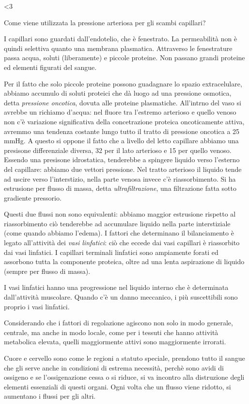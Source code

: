 \documentclass[a4paper,12pt]{article}
\begin{document}
<3

Come viene utilizzata la pressione arteriosa per gli scambi capillari?

I capillari sono guardati dall'endotelio, che è fenestrato. La permeabilità non è quindi selettiva quanto una membrana plasmatica. Attraverso le fenestrature passa acqua, soluti (liberamente) e piccole proteine. Non passano grandi proteine ed elementi figurati del sangue.

Per il fatto che solo piccole proteine possono guadagnare lo spazio extracelulare, abbiamo accumulo di soluti proteici che dà luogo ad una pressione osmotica, detta \emph{pressione oncotica}, dovuta alle proteine plasmatiche. All'intrno del vaso si avrebbe un richiamo d'acqua: nel fluore tra l'estremo arterioso e quello venoso non c'è variazione significativa della concetrazione proteica oncoticamente attiva, avremmo una tendenza costante lungo tutto il tratto di pressione oncotica a 25 mmHg. A questo si oppone il fatto che a livello del letto capillare abbiamo una presisone differenziale diversa, 32 per il lato arterioso e 15 per quello venoso. Essendo una presisone idrostatica, tenderebbe a spingere liquido verso l'esterno del capillare: abbiamo due vettori pressione. Nel tratto arterioso il liquido tende ad uscire verso l'interstizio, nella parte venosa invece c'è riassorbimento. Si ha estrusione per flusso di massa, detta \emph{ultrafiltrazione}, una filtrazione fatta sotto gradiente pressorio.

Questi due flussi non sono equivalenti: abbiamo maggior estrusione rispetto al riassorbimento ciò tenderebbe ad accumulare liquido nella parte interstiziale (come quando abbiamo l'edema). I fattori che determinano il bilanciamento è legato all'attività dei \emph{vasi linfatici}: ciò che eccede dai vasi capillari è riassorbito dai vasi linfatici. I capillari terminali linfatici sono ampiamente forati ed assorbono tutta la componente proteica, oltre ad una lenta aspirazione di liquido (sempre per flusso di massa).

I vasi linfatici hanno una progressione nel liquido interno che è determinata dall'attività muscolare. Quando c'è un danno meccanico, i più suscettibili sono proprio i vasi linfatici.

Considerando che i fattori di regolazione agiscono non solo in modo generale, centrale, ma anche in modo locale, come per i tessuti che hanno attività metabolica elevata, quelli maggiormente attivi sono maggiormente irrorati.

Cuore e cervello sono come le regioni a statuto speciale, prendono tutto il sangue che gli serve anche in condizioni di estrema necessità, perchè sono avidi di ossigeno e se l'ossigenazione cessa o si riduce, si va incontro alla distruzione degli elementi essenziali di questi organi. Ogni volta che un flusso viene ridotto, si aumentano i flussi per gli altri.
\end{document}
